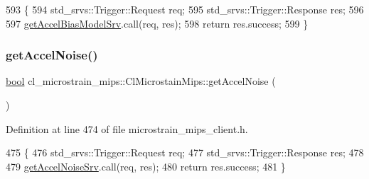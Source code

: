 \begin{DoxyCode}
593     \{
594         std\_srvs::Trigger::Request req;
595         std\_srvs::Trigger::Response res;
596 
597         \hyperlink{classcl__microstrain__mips_1_1ClMicrostainMips_a5516ee2ad71621f728245d0854104dc7}{getAccelBiasModelSrv}.call(req, res);
598         \textcolor{keywordflow}{return} res.success;
599     \}
\end{DoxyCode}
\mbox{\label{classcl__microstrain__mips_1_1ClMicrostainMips_a6b75108e49aca71fdff9ac7fd83aecc0}} 
\subsubsection{\texorpdfstring{get\+Accel\+Noise()}{getAccelNoise()}}
{\footnotesize\ttfamily \hyperlink{classbool}{bool} cl\+\_\+microstrain\+\_\+mips\+::\+Cl\+Microstain\+Mips\+::get\+Accel\+Noise (\begin{DoxyParamCaption}{ }\end{DoxyParamCaption})\hspace{0.3cm}{\ttfamily [inline]}}



Definition at line 474 of file microstrain\+\_\+mips\+\_\+client.\+h.


\begin{DoxyCode}
475     \{
476         std\_srvs::Trigger::Request req;
477         std\_srvs::Trigger::Response res;
478 
479         \hyperlink{classcl__microstrain__mips_1_1ClMicrostainMips_ae34d6cfd5e2e990d2fa3afab20ca9c01}{getAccelNoiseSrv}.call(req, res);
480         \textcolor{keywordflow}{return} res.success;
481     \}
\end{DoxyCode}
\mbox{\label{classcl__microstrain__mips_1_1ClMicrostainMips_a7ba22bfed70ee5796d9776b9438d0908}} 
